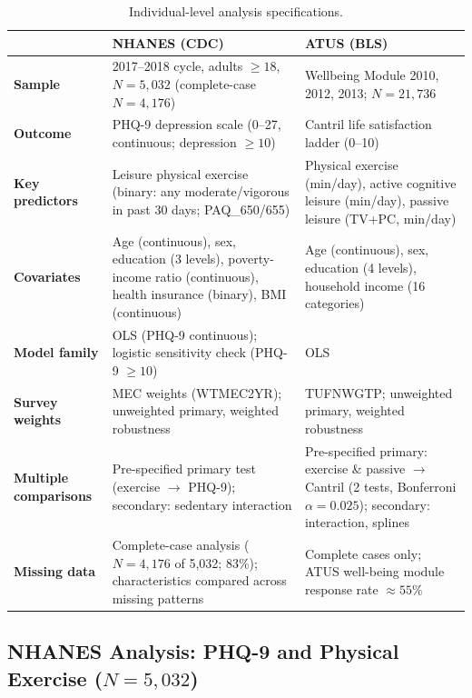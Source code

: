 \documentclass[a4paper,11pt,titlepage]{article}
\begin{document}
\begin{table}[htbp]
\centering
\caption{Individual-level analysis specifications.}
\label{tab:micro-specs}
\small
\begin{tabular}{p{3.2cm}p{5.8cm}p{5.8cm}}
\toprule
 & \textbf{NHANES (CDC)} & \textbf{ATUS (BLS)} \\
\midrule
\textbf{Sample} & 2017--2018 cycle, adults $\geq 18$, $N = 5{,}032$ (complete-case $N = 4{,}176$) & Wellbeing Module 2010, 2012, 2013; $N = 21{,}736$ \\
\textbf{Outcome} & PHQ-9 depression scale (0--27, continuous; depression $\geq 10$) & Cantril life satisfaction ladder (0--10) \\
\textbf{Key predictors} & Leisure physical exercise (binary: any moderate/vigorous in past 30 days; PAQ\_650/655) & Physical exercise (min/day), active cognitive leisure (min/day), passive leisure (TV+PC, min/day) \\
\textbf{Covariates} & Age (continuous), sex, education (3 levels), poverty-income ratio (continuous), health insurance (binary), BMI (continuous) & Age (continuous), sex, education (4 levels), household income (16 categories) \\
\textbf{Model family} & OLS (PHQ-9 continuous); logistic sensitivity check (PHQ-9 $\geq 10$) & OLS \\
\textbf{Survey weights} & MEC weights (WTMEC2YR); unweighted primary, weighted robustness & TUFNWGTP; unweighted primary, weighted robustness \\
\textbf{Multiple comparisons} & Pre-specified primary test (exercise $\to$ PHQ-9); secondary: sedentary interaction & Pre-specified primary: exercise \& passive $\to$ Cantril (2 tests, Bonferroni $\alpha = 0.025$); secondary: interaction, splines \\
\textbf{Missing data} & Complete-case analysis ($N = 4{,}176$ of 5{,}032; 83\%); characteristics compared across missing patterns & Complete cases only; ATUS well-being module response rate $\approx 55\%$ \\
\bottomrule
\end{tabular}
\end{table}

\subsection{\texorpdfstring{NHANES Analysis: PHQ-9 and Physical Exercise ($N=5{,}032$)}{NHANES Analysis: PHQ-9 and Physical Exercise (N=5,032)}}\label{sec:nhanes}
\end{document}
